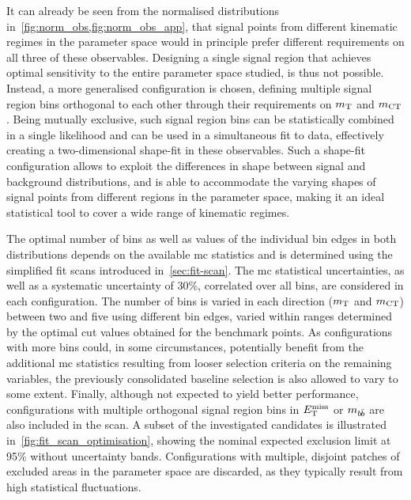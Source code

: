 It can already be seen from the normalised distributions in~\cref{fig:norm_obs,fig:norm_obs_app}, that signal points from different kinematic regimes in the parameter space would in principle prefer different requirements on all three of these observables.
Designing a single signal region that achieves optimal sensitivity to the entire parameter space studied, is thus not possible.
Instead, a more generalised configuration is chosen, defining multiple signal region bins orthogonal to each other through their requirements on $m_{\textrm{T}}$ and $m_{\textrm{CT}}$.
Being mutually exclusive, such signal region bins can be statistically combined in a single likelihood and can be used in a simultaneous fit to data, effectively creating a two-dimensional shape-fit in these observables.
Such a shape-fit configuration allows to exploit the differences in shape between signal and background distributions, and is able to accommodate the varying shapes of signal points from different regions in the parameter space, making it an ideal statistical tool to cover a wide range of kinematic regimes.

The optimal number of bins as well as values of the individual bin edges in both distributions depends on the available \gls{mc} statistics and is determined using the simplified fit scans introduced in~\cref{sec:fit-scan}.
The \gls{mc} statistical uncertainties, as well as a systematic uncertainty of 30\%, correlated over all bins, are considered in each configuration.
The number of bins is varied in each direction ($m_{\textrm{T}}$ and $m_{\textrm{CT}}$) between two and five using different bin edges, varied within ranges determined by the optimal cut values obtained for the benchmark points.
As configurations with more bins could, in some circumstances, potentially benefit from the additional \gls{mc} statistics resulting from looser selection criteria on the remaining variables, the previously consolidated baseline selection is also allowed to vary to some extent.
Finally, although not expected to yield better performance, configurations with multiple orthogonal signal region bins in $E_{\textrm{T}}^{\textrm{miss}}$ or $m_{b\hspace{-0.06em}\bar{b}}$ are also included in the scan.
A subset of the investigated candidates is illustrated in~\cref{fig:fit_scan_optimisation}, showing the nominal expected exclusion limit at 95\% without uncertainty bands.
Configurations with multiple, disjoint patches of excluded areas in the parameter space are discarded, as they typically result from high statistical fluctuations.

